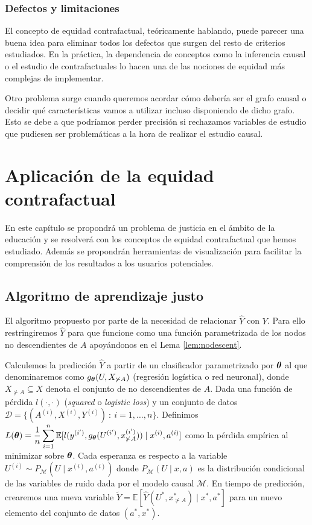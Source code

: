 \documentclass[oneside,openright,titlepage,numbers=noenddot,openany,headinclude,footinclude=true,
cleardoublepage=empty,abstractoff,BCOR=5mm,paper=a4,fontsize=12pt,main=spanish]{scrreprt}
\begin{document}
\subsection*{Defectos y limitaciones}

El concepto de equidad contrafactual, teóricamente hablando, puede parecer una buena idea para eliminar todos los defectos que surgen del resto de criterios estudiados. En la práctica, la dependencia de conceptos como la inferencia causal o el estudio de contrafactuales lo hacen una de las nociones de equidad más complejas de implementar. 

Otro problema surge cuando queremos acordar cómo debería ser el grafo causal o decidir qué características vamos a utilizar incluso disponiendo de dicho grafo. Esto se debe a que podríamos perder precisión si rechazamos variables de estudio que pudiesen ser problemáticas a la hora de realizar el estudio causal.


\chapter{Aplicación de la equidad contrafactual}

En este capítulo se propondrá un problema de justicia en el ámbito de la educación y se resolverá con los conceptos de equidad contrafactual que hemos estudiado. Además se propondrán herramientas de visualización para facilitar la comprensión de los resultados a los usuarios potenciales.

\section{Algoritmo de aprendizaje justo}

\label{sec:algoritmo}

El algoritmo propuesto por \cite{counterfactual2018} parte de la necesidad de relacionar $\hat{Y}$ con $Y$. Para ello restringiremos $\hat{Y}$ para que funcione como una función parametrizada de los nodos no descendientes de $A$ apoyándonos en el Lema \ref{lem:nodescent}. 

Calculemos la predicción $\hat{Y}$ a partir de un clasificador parametrizado por $\bm{\theta}$ al que denominaremos como $g_{\bm{\theta}}(U,X_{\not \succ A})$ (regresión logística o red neuronal), donde $X_{\not \succ A} \subseteq X$ denota el conjunto de no descendientes de $A$. Dada una función de pérdida $l(\cdot,\cdot)$ (\textit{squared} o \textit{logistic loss}) y un conjunto de datos $\mathcal{D}=\{(A^{(i)},X^{(i)},Y^{(i)}) \ : \ i=1,\dots,n\}$. Definimos $L(\bm{\theta})=\displaystyle \frac{1}{n} \sum_{i=1}^n \mathbb{E}[l(y^{(i')},g_{\bm{\theta}}(U^{(i')},x_{\not \succ A}^{(i')}))\mid x^{(i)},a^{(i)}]$ como la pérdida empírica al minimizar sobre $\bm{\theta}$. Cada esperanza es respecto a la variable $U^{(i)} \sim P_{\mathcal{M}}(U \mid x^{(i)},a^{(i)})$ donde $P_{\mathcal{M}}(U \mid x,a)$ es la distribución condicional de las variables de ruido dada por el modelo causal $\mathcal{M}$. En tiempo de predicción, crearemos una nueva variable $\tilde{Y}=\mathbb{E}[\hat{Y}(U^\ast,x_{\not \succ A}^\ast)\mid x^\ast, a^\ast]$ para un nuevo elemento del conjunto de datos $(a^\ast,x^\ast)$. 
\end{document}
